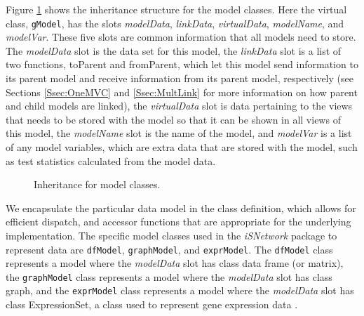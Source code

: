\documentclass{article}[11pt]
\newcommand{\Rfunction}[1]{{\textsf{#1}}}
\newcommand{\Rpackage}[1]{{\textit{#1}}}
\newcommand{\Rslot}[1]{\textsl{#1}}
\newcommand{\Rclass}[1]{\texttt{#1}}
\begin{document}
Figure \ref{Fig:Model} shows the inheritance structure for the model
classes.  Here the virtual class, \Rclass{gModel}, has the slots
\Rslot{modelData}, \Rslot{linkData}, \Rslot{virtualData}, \Rslot{modelName},
and \Rslot{modelVar}.  These five slots are common information that all models
need to store.  The \Rslot{modelData} slot is the data set for this model, the
\Rslot{linkData} slot is a list of two functions, \Rfunction{toParent} and
\Rfunction{fromParent}, which let this model send information to its parent
model and receive information from its parent model, respectively (see
Sections \ref{Ssec:OneMVC} and \ref{Ssec:MultLink} for more information on how
parent and child models are linked), the \Rslot{virtualData} slot is data
pertaining to the views that needs to be stored with the model so that it can
be shown in all views of this model, the \Rslot{modelName} slot is the
name of the model, and \Rslot{modelVar} is a list of any model variables,
which are extra data that are stored with the model, such as test statistics
calculated from the model data.  

\begin{figure}[ht]
  \begin{center}
    \caption{ Inheritance for model classes. }
    \label{Fig:Model}
  \end{center}
\end{figure}

We encapsulate the particular data model in the class definition, which allows
for efficient dispatch, and accessor functions that are appropriate for the
underlying implementation.  The specific model classes used in the
\Rpackage{iSNetwork} package to represent data are \Rclass{dfModel},
\Rclass{graphModel}, and \Rclass{exprModel}.  The \Rclass{dfModel} class
represents a model where the \Rslot{modelData} slot has class data frame (or
matrix), the \Rclass{graphModel} class represents a model where the
\Rslot{modelData} slot has class graph, and the \Rclass{exprModel} class
represents a model where the \Rslot{modelData} slot has class ExpressionSet,
a class used to represent gene expression data \cite{BioC}.
\end{document}

